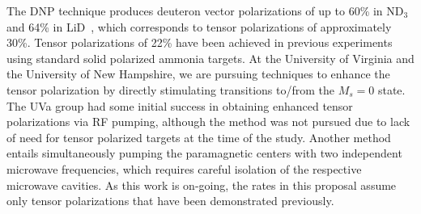 The DNP technique produces  deuteron vector polarizations of up to 60\%  in ND$_3$ and 64\% in LiD~\cite{Bueltmann:1998wq}, which corresponds to tensor polarizations of approximately 30\%.
Tensor polarizations of 22\% have been achieved in previous experiments~\cite{Meyer:1985dta}
using standard solid polarized ammonia targets.
At the University of Virginia and the University of New Hampshire, 
we are pursuing techniques to enhance the tensor polarization by directly stimulating 
transitions to/from the $M_s=0$ state.  The UVa group  had some initial 
success in obtaining enhanced tensor polarizations via RF pumping, although the method was not pursued due to
lack of need for tensor polarized targets at the time of the study.  Another method entails simultaneously pumping 
the paramagnetic centers with two independent microwave frequencies, which requires careful isolation of the 
respective microwave cavities. As this work is on-going, the rates in this proposal assume only  tensor polarizations that have been demonstrated previously.



